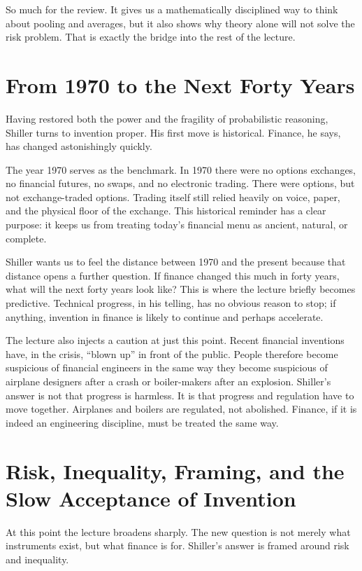 So much for the review. It gives us a mathematically disciplined way to think about pooling and averages, but it also shows why theory alone will not solve the risk problem. That is exactly the bridge into the rest of the lecture.

\section{From 1970 to the Next Forty Years}

Having restored both the power and the fragility of probabilistic reasoning, Shiller turns to invention proper. His first move is historical. Finance, he says, has changed astonishingly quickly.

The year 1970 serves as the benchmark. In 1970 there were no options exchanges, no financial futures, no swaps, and no electronic trading. There were options, but not exchange-traded options. Trading itself still relied heavily on voice, paper, and the physical floor of the exchange. This historical reminder has a clear purpose: it keeps us from treating today's financial menu as ancient, natural, or complete.

Shiller wants us to feel the distance between 1970 and the present because that distance opens a further question. If finance changed this much in forty years, what will the next forty years look like? This is where the lecture briefly becomes predictive. Technical progress, in his telling, has no obvious reason to stop; if anything, invention in finance is likely to continue and perhaps accelerate.

The lecture also injects a caution at just this point. Recent financial inventions have, in the crisis, ``blown up'' in front of the public. People therefore become suspicious of financial engineers in the same way they become suspicious of airplane designers after a crash or boiler-makers after an explosion. Shiller's answer is not that progress is harmless. It is that progress and regulation have to move together. Airplanes and boilers are regulated, not abolished. Finance, if it is indeed an engineering discipline, must be treated the same way.

\section{Risk, Inequality, Framing, and the Slow Acceptance of Invention}

At this point the lecture broadens sharply. The new question is not merely what instruments exist, but what finance is for. Shiller's answer is framed around risk and inequality.

